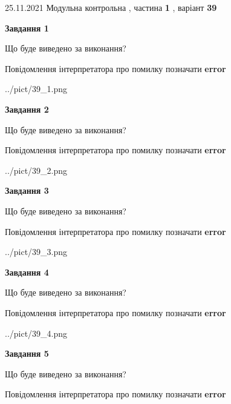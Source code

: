 \documentclass[10pt, ukrainian]{article}
\begin{document}
{25.11.2021 Модульна контрольна , частина \textbf { 1 }, варіант  \No \textbf { 39 }\par}
{
\begin {large}

{\begin {center}\textbf{Завдання 1}\end {center}}\par
Що буде виведено за виконання? \par
Повідомлення інтерпретатора про помилку позначати \textbf{error}

\begin{center}
	{../pict/39_1.png}
\end{center}
\newpage

{\begin {center}\textbf{Завдання 2}\end {center}}\par
Що буде виведено за виконання? \par
Повідомлення інтерпретатора про помилку позначати \textbf{error}

\begin{center}
	{../pict/39_2.png}
\end{center}
\newpage

{\begin {center}\textbf{Завдання 3}\end {center}}\par
Що буде виведено за виконання? \par
Повідомлення інтерпретатора про помилку позначати \textbf{error}

\begin{center}
	{../pict/39_3.png}
\end{center}
\newpage

{\begin {center}\textbf{Завдання 4}\end {center}}\par
Що буде виведено за виконання? \par
Повідомлення інтерпретатора про помилку позначати \textbf{error}

\begin{center}
	{../pict/39_4.png}
\end{center}
\newpage

{\begin {center}\textbf{Завдання 5}\end {center}}\par
Що буде виведено за виконання? \par
Повідомлення інтерпретатора про помилку позначати \textbf{error}


\end{large}}
\end{document}
